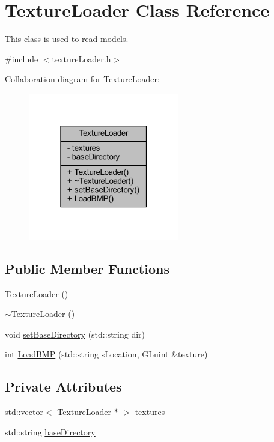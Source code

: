 \hypertarget{class_texture_loader}{}\section{Texture\+Loader Class Reference}
\label{class_texture_loader}


This class is used to read models.  




{\ttfamily \#include $<$texture\+Loader.\+h$>$}



Collaboration diagram for Texture\+Loader\+:\nopagebreak
\begin{figure}[H]
\begin{center}
\leavevmode
\includegraphics[width=187pt]{class_texture_loader__coll__graph}
\end{center}
\end{figure}
\subsection*{Public Member Functions}
\begin{DoxyCompactItemize}
\item 
\hyperlink{class_texture_loader_aafa6ca3bdbee3874a73aafae39d5c804}{Texture\+Loader} ()
\item 
\hyperlink{class_texture_loader_aee3a49f73e5f88890658b17e9896c4f2}{$\sim$\+Texture\+Loader} ()
\item 
void \hyperlink{class_texture_loader_a08f49a4b5cd9e0d5f84064de749b3eaf}{set\+Base\+Directory} (std\+::string dir)
\item 
int \hyperlink{class_texture_loader_af4f952eca0c705a8ba24ec5a7cb964aa}{Load\+B\+MP} (std\+::string s\+Location, G\+Luint \&texture)
\end{DoxyCompactItemize}
\subsection*{Private Attributes}
\begin{DoxyCompactItemize}
\item 
std\+::vector$<$ \hyperlink{class_texture_loader}{Texture\+Loader} $\ast$ $>$ \hyperlink{class_texture_loader_a09fe47aeb3e99643cae0ebd7ad90a434}{textures}
\item 
std\+::string \hyperlink{class_texture_loader_acd647e9e5e5ca9b1ba8b3e6ef0aa9d84}{base\+Directory}
\end{DoxyCompactItemize}


